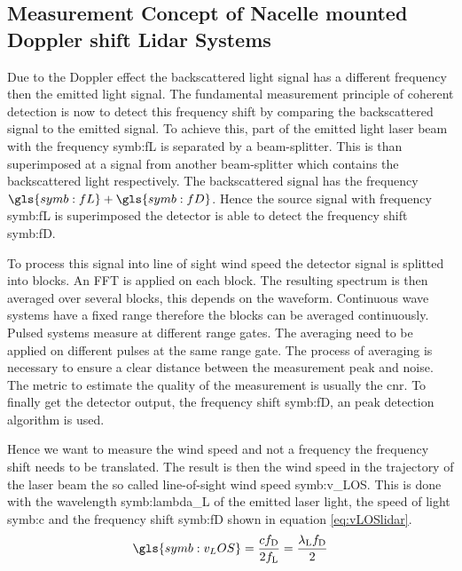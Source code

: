 \subsection{Measurement Concept of Nacelle mounted Doppler shift Lidar Systems}\label{subsec:LidarInWindConcept}
Due to the Doppler effect the backscattered light signal has a different frequency then the emitted light signal. The fundamental measurement principle of coherent detection is now to detect this frequency shift by comparing the backscattered signal to the emitted signal. To achieve this, part of the emitted light laser beam with the frequency \gls{symb:fL} is separated by a beam-splitter. This is than superimposed at a signal from another beam-splitter which contains the backscattered light respectively. The backscattered signal has the frequency $\gls{symb:fL} + \gls{symb:fD}$. Hence the source signal with frequency \gls{symb:fL} is superimposed the detector is able to detect the frequency shift \gls{symb:fD}.     

\noindent To process this signal into line of sight wind speed the detector signal is splitted into blocks. An \gls{FFT} is applied on each block. The resulting spectrum is then averaged over several blocks, this depends on the waveform. Continuous wave systems have a fixed range therefore the blocks can be averaged continuously. Pulsed systems measure at different range gates. The averaging need to be applied on different pulses at the same range gate. The process of averaging is necessary to ensure a clear distance between the measurement peak and noise. The metric to estimate the quality of the measurement is usually the \gls{cnr}. To finally get the detector output, the frequency shift \gls{symb:fD}, an peak detection algorithm is used.  

\noindent Hence we want to measure the wind speed and not a frequency the frequency shift needs to be translated. The result is then the wind speed in the trajectory of the laser beam the so called line-of-sight wind speed \gls{symb:v_LOS}. This is done with the wavelength \gls{symb:lambda_L} of the emitted laser light, the speed of light \gls{symb:c} and the frequency shift \gls{symb:fD} shown in equation \ref{eq:vLOSlidar}.
\begin{equation}
	\gls{symb:v_LOS} =  \frac{c f_\textnormal{D}}{2f_\textnormal{L}} = \frac{\lambda_\textnormal{L} f_\textnormal{D}}{2}
	\label{eq:vLOSlidar}	
\end{equation} 

